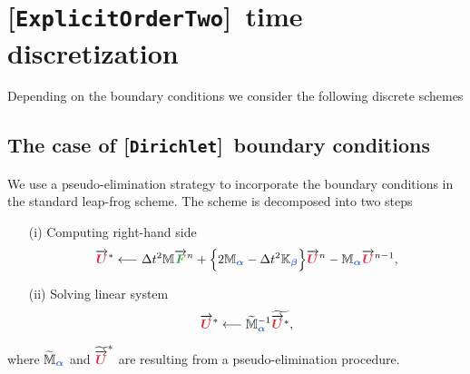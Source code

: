 \documentclass[11pt,a4paper]{article}
\newcommand{\unknown}[1]{\bm{{\color{myred}{#1}}}}
\newcommand{\param}[1]{\bm{{\color{myhyperblue}{#1}}}}
\newcommand{\data}[1]{\bm{{\color{mygreen}{#1}}}}
\newcommand{\keyword}[1]{[\texttt{\textbf{#1}}]\!\,}
\begin{document}
\section{\keyword{ExplicitOrderTwo} time discretization}
Depending on the boundary conditions we consider the following discrete schemes
\subsection{The case of \keyword{Dirichlet} boundary conditions}
We use a pseudo-elimination strategy to incorporate the boundary conditions in the standard leap-frog scheme. The scheme is decomposed into two steps
\begin{itemize}
\item[(i)] Computing right-hand side
\begin{equation*}
\overrightarrow{\unknown{U}}^* \longleftarrow \Delta t^2 \mathbb{M} \overrightarrow{\data{F}}^n + \Big\{ 2 \mathbb{M}_{\param{\alpha}} - \Delta t^2 \mathbb{K}_{\param{\beta}} \Big\} \overrightarrow{\unknown{U}}^{n} - \mathbb{M}_{\param{\alpha}} \overrightarrow{\unknown{U}}^{n-1},
\end{equation*}
\item[(ii)] Solving linear system
\begin{equation*}
\overrightarrow{\unknown{U}}^* \longleftarrow \widetilde{\mathbb{M}}_{\param{\alpha}}^{-1} \widetilde{\overrightarrow{\unknown{U}}^*},
\end{equation*}
\end{itemize}
where $\widetilde{\mathbb{M}}_{\param{\alpha}}$ and $\widetilde{\overrightarrow{\unknown{U}}}^*$ are resulting from a pseudo-elimination procedure.
\end{document}
